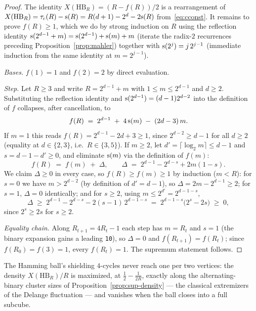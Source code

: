 \begin{proof}
	The identity $X(\mathrm{HB}_R) = (R - f(R))/2$ is a rearrangement of
	$X(\mathrm{HB}_R) = \tau_{\mathrm{c}}(R) - \mathrm{s}(R) = R(d+1) - 2^d - 2\mathrm{s}(R)$
	from~\eqref{eq:cconst}. It remains to prove $f(R) \ge 1$, which we do by
	strong induction on $R$ using the reflection identity
	$\mathrm{s}(2^{d-1} + m) = \mathrm{s}(2^{d-1}) + \mathrm{s}(m) + m$ (iterate the radix-$2$
	recurrences preceding Proposition~\ref{prop:mahler}) together with
	$\mathrm{s}(2^j) = j\,2^{j-1}$ (immediate induction from the same identity at
	$m = 2^{j-1}$).

	\emph{Bases.} $f(1) = 1$ and $f(2) = 2$ by direct evaluation.

	\emph{Step.} Let $R \ge 3$ and write $R = 2^{d-1} + m$ with
	$1 \le m \le 2^{d-1}$ and $d \ge 2$. Substituting the reflection identity
	and $\mathrm{s}(2^{d-1}) = (d-1)2^{d-2}$ into the definition of $f$ collapses,
	after cancellation, to
	\begin{equation*}
		f(R) \;=\; 2^{d-1} \;+\; 4\,\mathrm{s}(m) \;-\; (2d-3)\,m .
	\end{equation*}
	If $m = 1$ this reads $f(R) = 2^{d-1} - 2d + 3 \ge 1$, since
	$2^{d-2} \ge d - 1$ for all $d \ge 2$ (equality at $d \in \{2,3\}$,
	i.e.\ $R \in \{3, 5\}$). If $m \ge 2$, let
	$d' = \lceil \log_2 m \rceil \le d - 1$ and $s = d - 1 - d' \ge 0$, and
	eliminate $\mathrm{s}(m)$ via the definition of $f(m)$:
	\begin{equation*}
		f(R) \;=\; f(m) \;+\; \Delta,
		\qquad
		\Delta \;=\; 2^{d-1} - 2^{d-s} + 2m(1 - s).
	\end{equation*}
	We claim $\Delta \ge 0$ in every case, so $f(R) \ge f(m) \ge 1$ by
	induction ($m < R$): for $s = 0$ we have $m > 2^{d-2}$ (by definition of
	$d' = d-1$), so $\Delta = 2m - 2^{d-1} \ge 2$; for $s = 1$,
	$\Delta = 0$ identically; and for $s \ge 2$, using $m \le 2^{d'} =
	2^{d-1-s}$,
	\begin{equation*}
		\Delta \;\ge\; 2^{d-1} - 2^{d-s} - 2(s-1)\,2^{d-1-s}
		\;=\; 2^{d-1-s}\big(2^s - 2s\big) \;\ge\; 0,
	\end{equation*}
	since $2^s \ge 2s$ for $s \ge 2$.

	\emph{Equality chain.} Along $R_{t+1} = 4R_t - 1$ each step has
	$m = R_t$ and $s = 1$ (the binary expansion gains a leading
	\texttt{10}), so $\Delta = 0$ and $f(R_{t+1}) = f(R_t)$; since
	$f(R_0) = f(3) = 1$, every $f(R_t) = 1$. The supremum statement follows.
\end{proof}

\begin{remark}\label{rem:extremal}
	The Hamming ball's shielding $4$-cycles never reach one per two
	vertices: the density $X(\mathrm{HB}_R)/R$ is maximized, at
	$\tfrac12 - \tfrac{1}{2R}$, exactly along the alternating-binary
	cluster sizes of Proposition~\ref{prop:sup-density} --- the classical
	extremizers of the Delange fluctuation --- and vanishes when the ball
	closes into a full subcube.
\end{remark}

